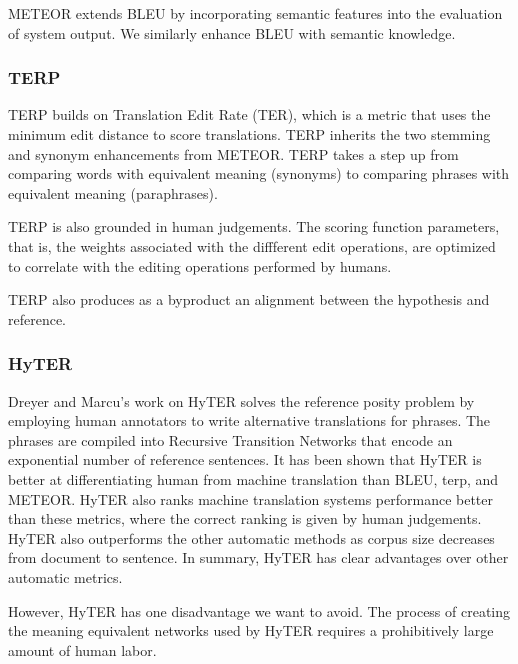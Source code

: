 
METEOR extends BLEU by incorporating semantic features into the evaluation of system output. 
We similarly enhance BLEU with semantic knowledge. 

\subsubsection{TERP}
\label{sec:terp}


TERP builds on Translation Edit Rate (TER), which is a metric that uses the minimum edit distance to score translations. 
TERP inherits the two stemming and synonym enhancements from METEOR. 
TERP takes a step up from comparing words with equivalent meaning    (synonyms) to comparing phrases with equivalent meaning (paraphrases). 

TERP is also grounded in human judgements. 
The scoring function parameters, that is, the weights associated with the diffferent edit operations, are optimized  to correlate with the  editing operations performed by humans. 

TERP also produces as a byproduct an alignment between the hypothesis and reference. 

\subsubsection{HyTER}
\label{sec:hyter}


Dreyer and Marcu's work  on HyTER  solves the reference posity problem by employing human annotators to write alternative translations for phrases. 
The phrases are compiled into Recursive Transition Networks that encode an exponential number of reference sentences. 
It has been shown that HyTER is better at differentiating human from machine translation than BLEU, terp, and METEOR. 
HyTER also ranks machine translation systems performance better than these metrics, where the correct ranking is given by human judgements. 
HyTER also outperforms the other automatic methods as corpus size decreases   from document to sentence. 
In summary, HyTER has clear advantages over other automatic metrics. 

However,   HyTER has one disadvantage we want to avoid. 
The process of creating the meaning equivalent networks used by HyTER requires a prohibitively large amount of human labor. 

